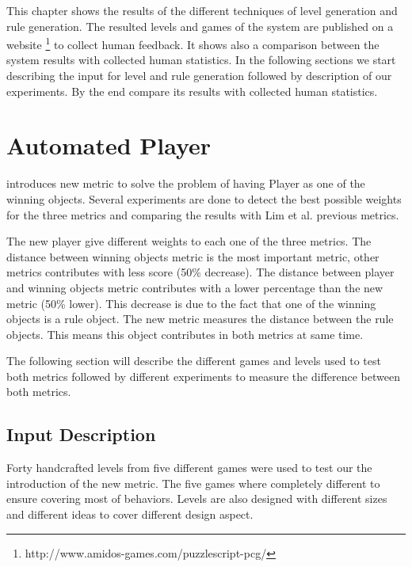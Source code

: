 This chapter shows the results of the different techniques of level generation and rule generation. The resulted levels and games of the system are published on a website \footnote{http://www.amidos-games.com/puzzlescript-pcg/} to collect human feedback. It shows also a comparison between the system results with collected human statistics. In the following sections we start describing the input for level and rule generation followed by description of our experiments. By the end  compare its results with collected human statistics.

\section{Automated Player}
 introduces new metric to solve the problem of having Player as one of the winning objects. Several experiments are done to detect the best possible weights for the three metrics and comparing the results with Lim et al.\cite{puzzleScriptGeneration} previous metrics.\\\par

The new player give different weights to each one of the three metrics. The distance between winning objects metric is the most important metric, other metrics contributes with less score (50\% decrease). The distance between player and winning objects metric contributes with a lower percentage than the new metric (50\% lower). This decrease is due to the fact that one of the winning objects is a rule object. The new metric measures the distance between the rule objects. This means this object contributes in both metrics at same time.\\\par

The following section will describe the different games and levels used to test both metrics followed by different experiments to measure the difference between both metrics.

\subsection{Input Description}
Forty handcrafted levels from five different games were used to test our the introduction of the new metric. The five games where completely different to ensure covering most of behaviors. Levels are also designed with different sizes and different ideas to cover different design aspect.\\\par

